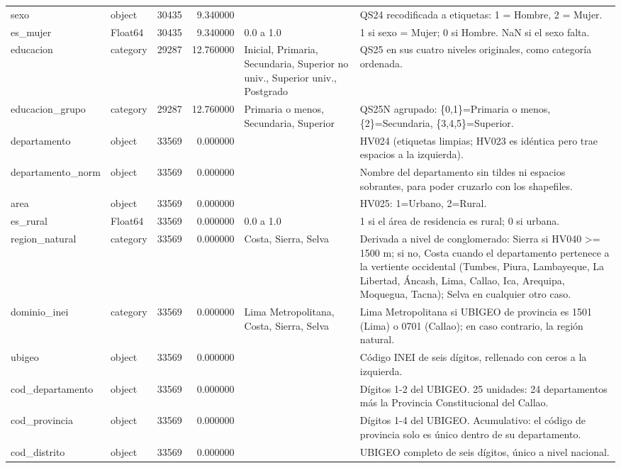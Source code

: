 \begin{longtable}{llrrll}
sexo & object & 30435 & 9.340000 &  & QS24 recodificada a etiquetas: 1 = Hombre, 2 = Mujer. \\
es\_mujer & Float64 & 30435 & 9.340000 & 0.0 a 1.0 & 1 si sexo = Mujer; 0 si Hombre. NaN si el sexo falta. \\
educacion & category & 29287 & 12.760000 & Inicial, Primaria, Secundaria, Superior no univ., Superior univ., Postgrado & QS25 en sus cuatro niveles originales, como categoría ordenada. \\
educacion\_grupo & category & 29287 & 12.760000 & Primaria o menos, Secundaria, Superior & QS25N agrupado: \{0,1\}=Primaria o menos, \{2\}=Secundaria, \{3,4,5\}=Superior. \\
departamento & object & 33569 & 0.000000 &  & HV024 (etiquetas limpias; HV023 es idéntica pero trae espacios a la izquierda). \\
departamento\_norm & object & 33569 & 0.000000 &  & Nombre del departamento sin tildes ni espacios sobrantes, para poder cruzarlo con los shapefiles. \\
area & object & 33569 & 0.000000 &  & HV025: 1=Urbano, 2=Rural. \\
es\_rural & Float64 & 33569 & 0.000000 & 0.0 a 1.0 & 1 si el área de residencia es rural; 0 si urbana. \\
region\_natural & category & 33569 & 0.000000 & Costa, Sierra, Selva & Derivada a nivel de conglomerado: Sierra si HV040 >= 1500 m; si no, Costa cuando el departamento pertenece a la vertiente occidental (Tumbes, Piura, Lambayeque, La Libertad, Áncash, Lima, Callao, Ica, Arequipa, Moquegua, Tacna); Selva en cualquier otro caso. \\
dominio\_inei & category & 33569 & 0.000000 & Lima Metropolitana, Costa, Sierra, Selva & Lima Metropolitana si UBIGEO de provincia es 1501 (Lima) o 0701 (Callao); en caso contrario, la región natural. \\
ubigeo & object & 33569 & 0.000000 &  & Código INEI de seis dígitos, rellenado con ceros a la izquierda. \\
cod\_departamento & object & 33569 & 0.000000 &  & Dígitos 1-2 del UBIGEO. 25 unidades: 24 departamentos más la Provincia Constitucional del Callao. \\
cod\_provincia & object & 33569 & 0.000000 &  & Dígitos 1-4 del UBIGEO. Acumulativo: el código de provincia solo es único dentro de su departamento. \\
cod\_distrito & object & 33569 & 0.000000 &  & UBIGEO completo de seis dígitos, único a nivel nacional. \\

\end{longtable}
